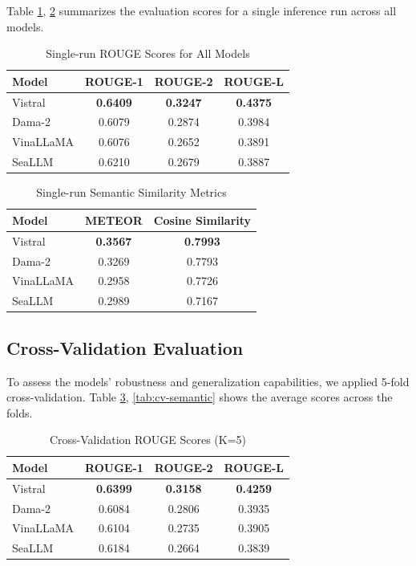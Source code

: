 \documentclass[runningheads]{llncs}
\begin{document}
Table \ref{tab:rouge-single-run}, \ref{tab:semantic-single-run} summarizes the evaluation scores for a single inference run across all models.

\begin{table}[H]
\centering
\caption{Single-run ROUGE Scores for All Models}
\label{tab:rouge-single-run}
\begin{tabular}{|l|c|c|c|}
\hline
\textbf{Model} & \textbf{ROUGE-1} & \textbf{ROUGE-2} & \textbf{ROUGE-L} \\
\hline
Vistral       & \textbf{0.6409} & \textbf{0.3247} & \textbf{0.4375} \\
Dama-2        & 0.6079          & 0.2874          & 0.3984          \\
VinaLLaMA     & 0.6076          & 0.2652          & 0.3891          \\
SeaLLM        & 0.6210          & 0.2679          & 0.3887          \\
\hline
\end{tabular}
\end{table} 

\begin{table}[H]
\centering
\caption{Single-run Semantic Similarity Metrics}
\label{tab:semantic-single-run}
\begin{tabular}{|l|c|c|}
\hline
\textbf{Model} & \textbf{METEOR} & \textbf{Cosine Similarity} \\
\hline
Vistral       & \textbf{0.3567} & \textbf{0.7993} \\
Dama-2        & 0.3269          & 0.7793          \\
VinaLLaMA     & 0.2958          & 0.7726          \\
SeaLLM        & 0.2989          & 0.7167          \\
\hline
\end{tabular}
\end{table}

\subsection{Cross-Validation Evaluation}

To assess the models' robustness and generalization capabilities, we applied 5-fold cross-validation. Table \ref{tab:cv-rouge}, \ref{tab:cv-semantic} shows the average scores across the folds.

\begin{table}[H]
\centering
\caption{Cross-Validation ROUGE Scores (K=5)}
\label{tab:cv-rouge}
\begin{tabular}{|l|c|c|c|}
\hline
\textbf{Model} & \textbf{ROUGE-1} & \textbf{ROUGE-2} & \textbf{ROUGE-L} \\
\hline
Vistral    & \textbf{0.6399} & \textbf{0.3158} & \textbf{0.4259} \\
Dama-2     & 0.6084 & 0.2806 & 0.3935 \\
VinaLLaMA  & 0.6104 & 0.2735 & 0.3905 \\
SeaLLM     & 0.6184 & 0.2664 & 0.3839 \\
\hline
\end{tabular}
\end{table}
\end{document}
